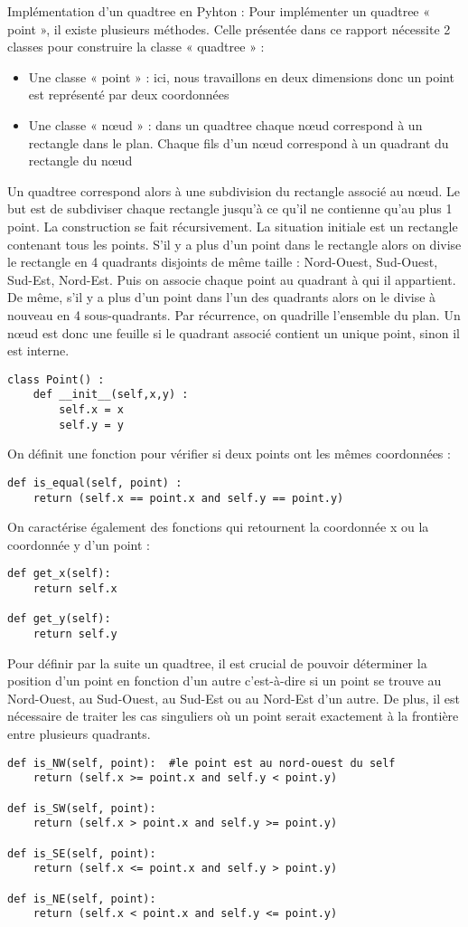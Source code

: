 \documentclass{report}
\begin{document}
Implémentation d’un quadtree en Pyhton :
Pour implémenter un quadtree « point », il existe plusieurs méthodes. Celle présentée dans ce rapport nécessite 2 classes pour construire la classe « quadtree » :
\begin{itemize}
\item Une classe « point » : ici, nous travaillons en deux dimensions donc un point est représenté par deux coordonnées
\item Une classe « nœud » : dans un quadtree chaque nœud correspond à un rectangle dans le plan. Chaque fils d’un nœud correspond à un quadrant du rectangle du nœud 
\end{itemize}
Un quadtree correspond alors à une subdivision du rectangle associé au nœud. Le but est de subdiviser chaque rectangle jusqu’à ce qu’il ne contienne qu’au plus 1 point.
La construction se fait récursivement. La situation initiale est un rectangle contenant tous les points. S’il y a plus d’un point dans le rectangle alors on divise le rectangle en 4 quadrants disjoints de même taille : Nord-Ouest, Sud-Ouest, Sud-Est, Nord-Est. Puis on associe chaque point au quadrant à qui il appartient. De même, s’il y a plus d’un point dans l’un des quadrants alors on le divise à nouveau en 4 sous-quadrants. Par récurrence, on quadrille l’ensemble du plan.
Un nœud est donc une feuille si le quadrant associé contient un unique point, sinon il est interne.
\begin{lstlisting}
class Point() :
	def __init__(self,x,y) :
		self.x = x
		self.y = y
\end{lstlisting}

On définit une fonction pour vérifier si deux points ont les mêmes coordonnées : 
\begin{lstlisting}
def is_equal(self, point) :
	return (self.x == point.x and self.y == point.y)
\end{lstlisting}

On caractérise également des fonctions qui retournent la coordonnée x ou la coordonnée y d’un point :
\begin{lstlisting}
def get_x(self):
	return self.x
	
def get_y(self):
	return self.y
\end{lstlisting}
 
Pour définir par la suite un quadtree, il est crucial de pouvoir déterminer la position d’un point en fonction d’un autre c’est-à-dire si un point se trouve au Nord-Ouest, au Sud-Ouest, au Sud-Est ou au Nord-Est d’un autre. De plus, il est nécessaire de traiter les cas singuliers où un point serait exactement à la frontière entre plusieurs quadrants.
\begin{lstlisting}
def is_NW(self, point):  #le point est au nord-ouest du self
	return (self.x >= point.x and self.y < point.y)
		
def is_SW(self, point):
	return (self.x > point.x and self.y >= point.y)
		
def is_SE(self, point):
	return (self.x <= point.x and self.y > point.y)
		
def is_NE(self, point):
	return (self.x < point.x and self.y <= point.y)
\end{lstlisting} 
\end{document}
